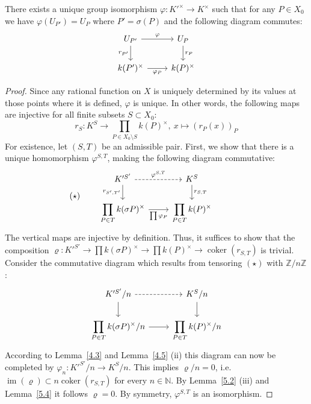 \begin{step}
There exists a unique group isomorphism $\varphi:K'^\times\to K^\times$ such that for any $P\in X_0$ we have $\varphi(U_{P'})=U_P$ where $P'=\sigma(P)$ and the following diagram commutes:
\[ \begin{tikzcd}
U_{P'} \ar[r, "\varphi"]\ar[d, "r_{P'}"'] & U_P \ar[d, "r_P"]\\
k(P')^\times \ar[r, "\varphi_P"'] & k(P)^\times
\end{tikzcd} \]
\end{step}

\begin{proof}
Since any rational function on $X$ is uniquely determined by its values at those points where it is defined, $\varphi$ is unique. In other words, the following maps are injective for all finite subsets $S\subset X_0$:
\[ r_S:K^S \to\prod_{P\in X_0\setminus S} k(P)^\times,\ x\mapsto (r_P(x))_P \]
For existence, let $(S,T)$ be an admissible pair. First, we show that there is a unique homomorphism $\varphi^{S,T}$, making the following diagram commutative:
\[ (\star) \qquad \begin{tikzcd}
K'^{S'} \rar["\varphi^{S,T}", dashed] \dar["r_{S',T'}"'] & K^S \dar["r_{S,T}"]\\
\displaystyle \prod_{P\in T}k(\sigma P)^\times \rar["\prod\varphi_P"'] & \displaystyle \prod_{P\in T}k(P)^\times
\end{tikzcd} \phantom{\qquad (\star)} \]
The vertical maps are injective by definition. Thus, it suffices to show that the composition $\varrho:K'^{S'}\to\prod k(\sigma P)^\times\to \prod k(P)^\times\to\operatorname{coker}(r_{S,T})$ is trivial. Consider the commutative diagram which results from tensoring $(\star)$ with $\mathbb{Z}/n\mathbb{Z}$:
\[ \begin{tikzcd}
K'^{S'}/n \rar[dashed]\dar & K^S/n\dar\\
\displaystyle \prod_{P\in T}k(\sigma P)^\times/n \rar & \displaystyle \prod_{P\in T}k(P)^\times/n
\end{tikzcd} \]
According to Lemma~\ref{4.3} and Lemma~\ref{4.5} (ii) this diagram can now be completed by $\varphi_n: K'^{S'}/n\to K^S/n$. This implies $\varrho/n=0$, i.e. $\operatorname{im}(\varrho)\subset n\operatorname{coker}(r_{S,T})$ for every $n\in\mathbb{N}$. By Lemma~\ref{5.2} (iii) and Lemma~\ref{5.4} it follows $\varrho = 0$. By symmetry, $\varphi^{S,T}$ is an isomorphism.


\end{proof}
